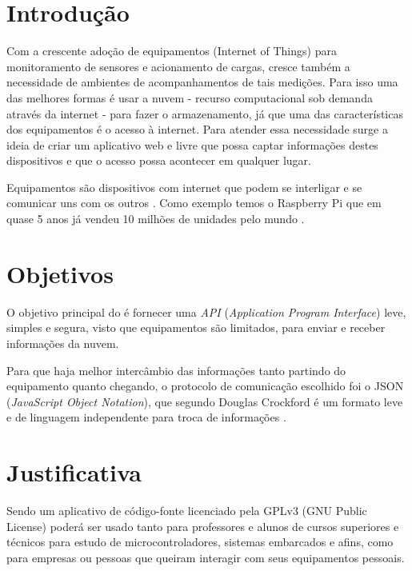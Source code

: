 \section{Introdução}\label{introduuxe7uxe3o}

Com a crescente adoção de equipamentos \iot (Internet of Things) para
monitoramento de sensores e acionamento de cargas, cresce também a
necessidade de ambientes de acompanhamentos de tais medições. Para isso
uma das melhores formas é usar a nuvem - recurso computacional sob
demanda através da internet \cite{ibm-cloud:2015} - para fazer o
armazenamento, já que uma das características dos equipamentos \iot é o
acesso à internet. Para atender essa necessidade surge a ideia de criar
um aplicativo web e livre que possa captar informações destes
dispositivos e que o acesso possa acontecer em qualquer lugar.

Equipamentos \iot são dispositivos com internet que podem se interligar
e se comunicar uns com os outros \cite{revell:2013}. Como exemplo temos
o Raspberry Pi que em quase 5 anos já vendeu 10 milhões de unidades pelo
mundo \cite{raspberry-pi-blog:2016}.

\section{Objetivos}\label{objetivos}

O objetivo principal do \wm é fornecer uma \emph{API} (\emph{Application
Program Interface}) leve, simples e segura, visto que equipamentos
\iot são limitados, para enviar e receber informações da nuvem.

Para que haja melhor intercâmbio das informações tanto partindo do
equipamento \iot quanto chegando, o protocolo de comunicação escolhido
foi o JSON (\emph{JavaScript Object Notation}), que segundo Douglas
Crockford é um formato leve e de linguagem independente para troca de
informações \cite{crockford:2015}.

\section{Justificativa}\label{justificativa}

Sendo um aplicativo de código-fonte licenciado pela GPLv3 (GNU Public
License) poderá ser usado tanto para professores e alunos de cursos
superiores e técnicos para estudo de microcontroladores, sistemas
embarcados e afins, como para empresas ou pessoas que queiram interagir
com seus equipamentos pessoais.

